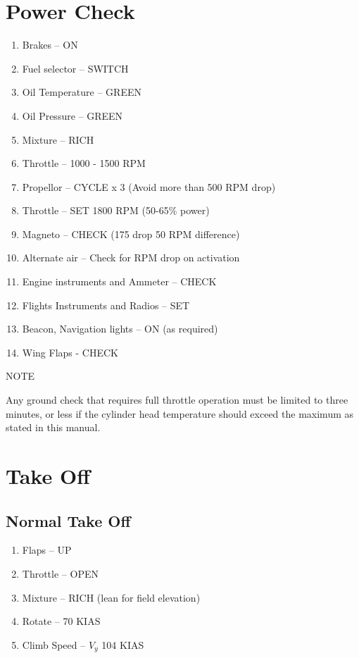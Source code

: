 \section{Power Check}
\begin{enumerate}[(1)]
  \item Brakes -- ON
  \item Fuel selector -- SWITCH
  \item Oil Temperature -- GREEN
  \item Oil Pressure -- GREEN
  \item Mixture -- RICH
  \item Throttle -- 1000 - 1500  RPM
  \item Propellor -- CYCLE x 3 (Avoid more than 500 RPM drop)
  \item Throttle -- SET 1800 RPM (50-65\% power)
  \item Magneto -- CHECK (175 drop 50 RPM difference)
  \item Alternate air -- Check for RPM drop on activation
  \item Engine instruments and Ammeter -- CHECK 
  \item Flights Instruments and Radios -- SET
  \item Beacon, Navigation lights -- ON (as required)
  \item Wing Flaps - CHECK 
\end{enumerate} 

\begin{center}
NOTE
 
Any ground check that requires full throttle operation must be limited to three minutes, or less if the cylinder head temperature should exceed the maximum as stated in this manual.
\end{center}

\section{Take Off}
\subsection{Normal Take Off}
\begin{enumerate}[(1)]
  \item Flaps -- UP
  \item Throttle -- OPEN 
  \item Mixture -- RICH (lean for field elevation)
  \item Rotate -- 70 KIAS
  \item Climb Speed -- $V_y$ 104 KIAS 
\end{enumerate}
